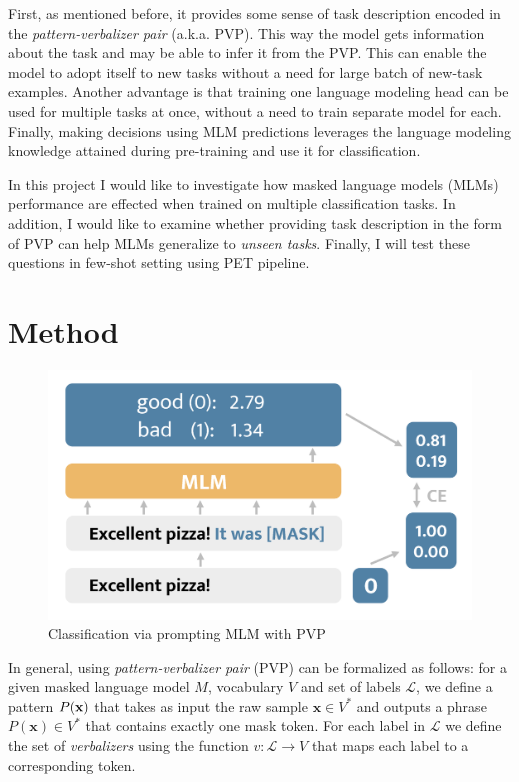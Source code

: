 \documentclass[11pt,a4paper]{article}
\begin{document}
First, as mentioned before, it provides some sense of task description encoded in the \textit{pattern-verbalizer pair} (a.k.a. PVP).
This way the model gets information about the task and may be able to infer it from the PVP.
This can enable the model to adopt itself to new tasks without a need for large batch of new-task examples.
Another advantage is that training one language modeling head can be used for multiple tasks at once, without a need to train separate model for each.
Finally, making decisions using MLM predictions leverages the language modeling knowledge attained during pre-training and use it for classification.

In this project I would like to investigate how masked language models (MLMs) performance are effected when trained on multiple classification tasks.
In addition, I would like to examine whether providing task description in the form of PVP can help MLMs generalize to \textit{unseen tasks}.
Finally, I will test these questions in few-shot setting using PET pipeline.



\section{Method}

\begin{figure}[b]
	\centering
	\includegraphics[width=\linewidth]{mlm_classification}
	\caption{Classification via prompting MLM with PVP}
	\label{normal_case}
\end{figure}

In general, using \textit{pattern-verbalizer pair} (PVP) can be formalized as follows: for a given masked language model $M$, vocabulary $V$ and set of labels $\mathcal{L}$, we define a pattern $P(\textbf{\text{x}})$ that takes as input the raw sample $\textbf{x}\in{}V^*$ and outputs a phrase $P(\textbf{x})\in{}V^*$ that contains exactly one mask token.
For each label in $\mathcal{L}$ we define the set of \textit{verbalizers} using the function $v:\mathcal{L}\rightarrow{}V$ that maps each label to a corresponding token.
\end{document}
